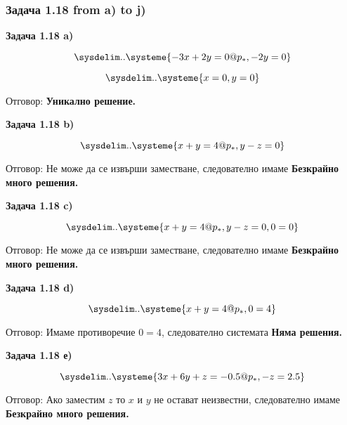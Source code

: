 \documentclass{subfiles}
\begin{document}
\subsubsection{Задача 1.18 from a) to j)}

\noindent \textbf{Задача 1.18 a)}

\begin{equation*}
    \sysdelim..\systeme{
        -3x + 2y = 0@p_{*},
        -2y = 0
    }
\end{equation*}

\begin{equation*}
    \sysdelim..\systeme{
        x = 0,
        y = 0
    }
\end{equation*}

\noindent Отговор: \textbf{Уникално решение.}

\noindent \textbf{Задача 1.18 b)}

\begin{equation*}
    \sysdelim..\systeme{
        x + y = 4@p_{*},
        y - z = 0
    }
\end{equation*}

\noindent Отговор: Не може да се извърши заместване, следователно имаме \textbf{Безкрайно много решения.}

\noindent \textbf{Задача 1.18 c)}

\begin{equation*}
    \sysdelim..\systeme{
        x + y = 4@p_{*},
        y - z = 0,
        0 = 0
    }
\end{equation*}

\noindent Отговор: Не може да се извърши заместване, следователно имаме \textbf{Безкрайно много решения.}

\noindent \textbf{Задача 1.18 d)}

\begin{equation*}
    \sysdelim..\systeme{
        x + y = 4@p_{*},
        0 = 4
    }
\end{equation*}

\noindent Отговор: Имаме противоречие $0=4$, следователно системата \textbf{Няма решения.}

\noindent \textbf{Задача 1.18 е)}

\begin{equation*}
    \sysdelim..\systeme{
        3x + 6y + z = -0.5@p_{*},
        -z = 2.5
    }
\end{equation*}

\noindent Отговор: Ако заместим $z$ то $x$ и $y$ не остават неизвестни, следователно имаме \textbf{Безкрайно много решения.}
\end{document}

